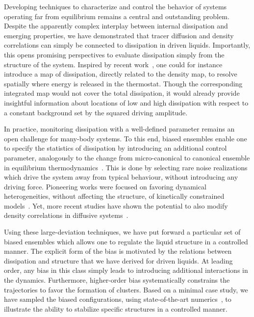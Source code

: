 \documentclass[superscriptaddress, twocolumn, prx, longbibliography, nofootinbib]{revtex4-1}
\begin{document}
Developing techniques to characterize and control the behavior of systems operating far from equilibrium remains a central and outstanding problem. Despite the apparently complex interplay between internal dissipation and emerging properties, we have demonstrated that tracer diffusion and density correlations can simply be connected to dissipation in driven liquids. Importantly, this opens promising perspectives to evaluate dissipation simply from the structure of the system. Inspired by recent work~\cite{Nardini2017}, one could for instance introduce a map of dissipation, directly related to the density map, to resolve spatially where energy is released in the thermostat. Though the corresponding integrated map would not cover the total dissipation, it would already provide insightful information about locations of low and high dissipation with respect to a constant background set by the squared driving amplitude.


In practice, monitoring dissipation with a well-defined parameter remains an open challenge for many-body systems. To this end, biased ensembles enable one to specify the statistics of dissipation by introducing an additional control parameter, analogously to the change from micro-canonical to canonical ensemble in equilibrium thermodynamics~\cite{Chetrite2013, Jack2010}. This is done by selecting rare noise realizations which drive the system away from typical behaviour, without introducing any driving force. Pioneering works were focused on favoring dynamical heterogeneities, without affecting the structure, of kinetically constrained models~\cite{garrahan2007, Hedges2009, Pitard2011, Speck2012, Bodineau2012a}. Yet, more recent studies have shown the potential to also modify density correlations in diffusive systems~\cite{Jack2014, Cagnetta2017, Nemoto2019}.


Using these large-deviation techniques, we have put forward a particular set of biased ensembles which allows one to regulate the liquid structure in a controlled manner. The explicit form of the bias is motivated by the relations between dissipation and structure that we have derived for driven liquids. At leading order, any bias in this class simply leads to introducing additional interactions in the dynamics. Furthermore, higher-order bias systematically constrains the trajectories to favor the formation of clusters. Based on a minimal case study, we have sampled the biased configurations, using state-of-the-art numerics~\cite{Giadina2006, tailleur2007probing, Hurtado2009, Nemoto2016, Ray2018, Klymko2018, Brewer2018}, to illustrate the ability to stabilize specific structures in a controlled manner. 
\end{document}
